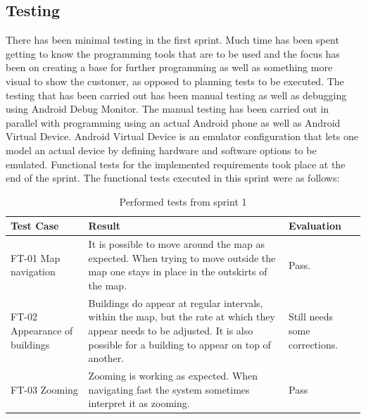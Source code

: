\subsection{Testing}
	There has been minimal testing in the first sprint. Much time has been spent getting to know 
	the programming tools that are to be used and the focus has been on creating a base for further 
	programming as well as something more visual to show the customer, as opposed to planning tests 
	to be executed. The testing that has been carried out has been manual testing as well as 
	debugging using Android Debug Monitor. The manual testing has been carried out in parallel 
	with programming using an actual Android phone as well as Android Virtual Device. Android Virtual Device 
	is an emulator configuration that lets one model an actual device by defining hardware and 
	software options to be emulated. Functional tests for the implemented requirements took place at 
	the end of the sprint. The functional tests executed in this sprint were as follows:


\begin{table}
\begin{tabular}{| p{3cm} | p{7cm} | p{2cm} |}
	\hline
	\rowcolor{lightgray}
	{\bf Test Case} & {\bf Result} & {\bf Evaluation} \\ \hline
	FT-01 Map navigation & It is possible to move around the map as expected. When trying to move outside the map one stays in place in the outskirts of the map. & Pass. \\ \hline
  	FT-02 Appearance of buildings & Buildings do appear at regular intervals, within the map, but the rate at which they appear needs to be adjusted. It is also possible for a building to appear on top of another. & Still needs some corrections. \\ \hline
	FT-03 Zooming & Zooming is working as expected. When navigating fast the system sometimes interpret it as zooming. & Pass \\ \hline
\end{tabular}
\caption{Performed tests from sprint 1}
\end{table}

